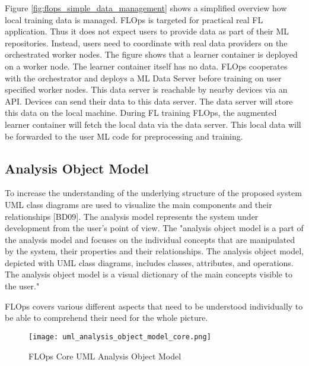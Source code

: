 Figure \ref{fig:flops_simple_data_management} shows a simplified overview how local training data is managed.
FLOps is targeted for practical real FL application.
Thus it does not expect users to provide data as part of their ML repositories.
Instead, users need to coordinate with real data providers on the orchestrated worker nodes.
The figure shows that a learner container is deployed on a worker node.
The learner container itself has no data. 
FLOps cooperates with the orchestrator and deploys a ML Data Server before training on user specified worker nodes.
This data server is reachable by nearby devices via an API.
Devices can send their data to this data server.
The data server will store this data on the local machine.
During FL training FLOps, the augmented learner container will fetch the local data via the data server.
This local data will be forwarded to the user ML code for preprocessing and training.



\subsection{Analysis Object Model}
To increase the understanding of the underlying structure of the proposed
system UML class diagrams are used to visualize the main components and
their relationships [BD09].
The analysis model represents the system under development from the user’s point of view. The
"analysis object model is a part of the analysis model and focuses on the individual concepts that
are manipulated by the system, their properties and their relationships. The analysis object
model, depicted with UML class diagrams, includes classes, attributes, and operations. The
analysis object model is a visual dictionary of the main concepts visible to the user."

FLOps covers various different aspects that need to be understood individually to be able to comprehend their need for the whole picture.



\begin{figure}[h]
    \centering
    \texttt{[image: uml\_analysis\_object\_model\_core.png]}
    \caption{FLOps Core UML Analysis Object Model}
    \label{fig:uml_core_analysis_object_model}
\end{figure}

